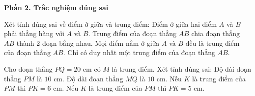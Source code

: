 \textbf{Phần 2. Trắc nghiệm đúng sai}

\begin{ex} %
Xét tính đúng sai về điểm ở giữa và trung điểm:
\choiceTF
{\True Điểm ở giữa hai điểm $A$ và $B$ phải thẳng hàng với $A$ và $B$.}
{\True Trung điểm của đoạn thẳng $AB$ chia đoạn thẳng $AB$ thành 2 đoạn bằng nhau.}
{Mọi điểm nằm ở giữa $A$ và $B$ đều là trung điểm của đoạn thẳng $AB$.}
{\True Chỉ có duy nhất một trung điểm của đoạn thẳng $AB$.}
\end{ex}

\begin{ex} %
Cho đoạn thẳng $PQ = 20\text{ cm}$ có $M$ là trung điểm. Xét tính đúng sai:
\choiceTF
{\True Độ dài đoạn thẳng $PM$ là $10\text{ cm}$.}
{\True Độ dài đoạn thẳng $MQ$ là $10\text{ cm}$.}
{Nếu $K$ là trung điểm của $PM$ thì $PK = 6\text{ cm}$.}
{\True Nếu $K$ là trung điểm của $PM$ thì $PK = 5\text{ cm}$.}
\end{ex}

